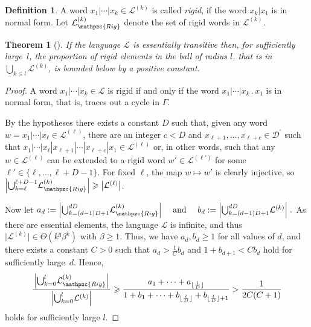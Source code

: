 \documentclass[a4paper,final]{article}
\let\le\leqslant
\let\ge\geqslant
\theoremstyle{plain}
\newtheorem{theorem}{Theorem}
\theoremstyle{remark}
\theoremstyle{definition}
\newtheorem{definition}[definition]{Definition}
\begin{document}
\begin{definition}
 A word $x_1|\cdots|x_k\in{\mathcal{L}}^{(k)}$ is called \emph{rigid}, if the word $x_k|x_1$ is in normal form.
 Let ${\mathcal{L}}_{\mathpzc{Rig}}^{(k)}$ denote the set of rigid words in ${\mathcal{L}}^{(k)}$.
\end{definition}

\begin{theorem}[{\cite[Proposition~4.1]{Caruso13}}] \label{PercentageOfRigid}
  If the language ${\mathcal{L}}$ is essentially transitive then, for sufficiently large~$l$, the proportion of rigid elements in the ball of radius $l$, that is in ${\bigcup}_{k\le l}{\mathcal{L}}^{(k)}$, is bounded below by a positive constant.
\end{theorem}
\begin{proof}
  {}
  {}
  A word $x_1|\cdots|x_k \in {\mathcal{L}}$ is rigid if and only if the word $x_1|\cdots|x_k{\mathbin{.}} x_1$ is in normal form, that is, traces out a cycle in ${\Gamma}$.
  
  By the hypotheses there exists a constant $D$ such that, given any word
  $w = x_1|\cdots|x_\ell \in {\mathcal{L}}^{(\ell)}$, there are an integer $c<D$ and $x_{\ell+1},\ldots,x_{\ell+c} \in {{\mathcal{D}}^{\!{}^{\circ}\!}}$ such that
  $x_1|\cdots|x_\ell|x_{\ell+1}|\cdots|x_{\ell+c}|x_1 \in {\mathcal{L}}^{(\ell)}$ or, in other words,
  such that any $w \in {\mathcal{L}}^{(\ell)}$ can be extended to a rigid word $w' \in {\mathcal{L}}^{(\ell')}$ for some $\ell'\in\{\ell,\ldots,\ell+D-1\}$.
  For fixed $\ell$, the map $w\mapsto w'$ is clearly injective, so
  $\Big|{\bigcup}_{k=\ell}^{\ell+D-1} {\mathcal{L}}_{\mathpzc{Rig}}^{(k)}\Big| \ge \big|{\mathcal{L}}^{(\ell)}\big|$.

  Now let
  $
     a_d := \Big| {\bigcup}_{k=(d-1)D+1}^{dD} {\mathcal{L}}_{\mathpzc{Rig}}^{(k)} \Big|
     \quad\text{ and }\quad
     b_d := \Big| {\bigcup}_{k=(d-1)D+1}^{dD} {\mathcal{L}}^{(k)} \Big|
     \;.
  $
  As there are essential elements, the language ${\mathcal{L}}$ is infinite, and thus $\big|{\mathcal{L}}^{(k)}\big|\in\Theta(k^{q}{\beta}^k)$ with $\beta\ge 1$.
  Thus, we have $a_d, b_d\ge 1$ for all values of $d$, and there exists a constant $C>0$ such that $a_d > \frac1C b_d$ and $1+b_{d+1} < C b_d$ hold for sufficiently large~$d$.
  Hence,
  \[
    \frac{\,\Big|{\bigcup}_{k=0}^l {\mathcal{L}}_{\mathpzc{Rig}}^{(k)}\Big|\,}{\,\Big|{\bigcup}_{k=0}^l {\mathcal{L}}^{(k)}\Big|\,}
    \ge \frac{a_1+\cdots+a_{\lfloor\frac{l}{D}\rfloor}}
             {1+b_1+\cdots+b_{\lfloor\frac{l}{D}\rfloor}+b_{\lfloor\frac{l}{D}\rfloor+1}}
    > \frac1{2C(C+1)} 
  \]
  holds for sufficiently large $l$.
\end{proof}
\end{document}
